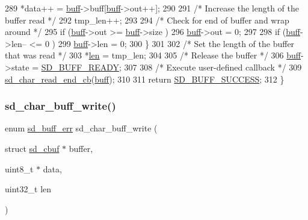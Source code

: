 \begin{DoxyCode}
289  *data++ = \mbox{\hyperlink{structsd__cbuf_a8b212742c92a124f2eb4a244acc19f7c}{buff}}->buff[\mbox{\hyperlink{structsd__cbuf_a8b212742c92a124f2eb4a244acc19f7c}{buff}}->out++];
290     
291         \textcolor{comment}{/* Increase the length of the buffer read */}
292         tmp\_len++;
293     
294         \textcolor{comment}{/* Check for end of buffer and wrap around */}
295         \textcolor{keywordflow}{if} (\mbox{\hyperlink{structsd__cbuf_a8b212742c92a124f2eb4a244acc19f7c}{buff}}->out >= \mbox{\hyperlink{structsd__cbuf_a8b212742c92a124f2eb4a244acc19f7c}{buff}}->size )
296             \mbox{\hyperlink{structsd__cbuf_a8b212742c92a124f2eb4a244acc19f7c}{buff}}->out = 0;
297     
298         \textcolor{keywordflow}{if} (\mbox{\hyperlink{structsd__cbuf_a8b212742c92a124f2eb4a244acc19f7c}{buff}}->len-- <= 0 )
299             \mbox{\hyperlink{structsd__cbuf_a8b212742c92a124f2eb4a244acc19f7c}{buff}}->len = 0;
300     \}
301   
302     \textcolor{comment}{/* Set the length of the buffer that was read */}
303     *\mbox{\hyperlink{structsd__cbuf_a96bbf959016e4411c9e6b9812a8be60a}{len}} = tmp\_len;
304   
305     \textcolor{comment}{/* Release the buffer */}
306     \mbox{\hyperlink{structsd__cbuf_a8b212742c92a124f2eb4a244acc19f7c}{buff}}->state = \mbox{\hyperlink{group___s_d___buffer___types_gga52f14e9c7b7d9ba092e1cd615559012ba99d36bbc57255841b60f77f1a0059c7c}{SD\_BUFF\_READY}};
307   
308     \textcolor{comment}{/* Execute user-defined callback */}
309     \mbox{\hyperlink{group___s_d___buffer___functions_ga17d8b9804dc4f2cbfbf03a5c23d227e7}{sd\_char\_read\_end\_cb}}(\mbox{\hyperlink{structsd__cbuf_a8b212742c92a124f2eb4a244acc19f7c}{buff}});
310   
311     \textcolor{keywordflow}{return} \mbox{\hyperlink{group___s_d___buffer___types_gga012d8a07d989f00e3f9c4a2f62743de4a57815778d30aaa889a6e73dfc081e5f6}{SD\_BUFF\_SUCCESS}};
312 \}
\end{DoxyCode}
\mbox{\label{group___s_d___buffer___functions_ga4e78b9eaa502531cda91c47a1b5ea801}} 
\subsubsection{\texorpdfstring{sd\+\_\+char\+\_\+buff\+\_\+write()}{sd\_char\_buff\_write()}}
{\footnotesize\ttfamily enum \mbox{\hyperlink{group___s_d___buffer___types_ga012d8a07d989f00e3f9c4a2f62743de4}{sd\+\_\+buff\+\_\+err}} sd\+\_\+char\+\_\+buff\+\_\+write (\begin{DoxyParamCaption}\item[{struct \mbox{\hyperlink{structsd__cbuf}{sd\+\_\+cbuf}} $\ast$}]{buffer,  }\item[{uint8\+\_\+t $\ast$}]{data,  }\item[{uint32\+\_\+t}]{len }\end{DoxyParamCaption})}



